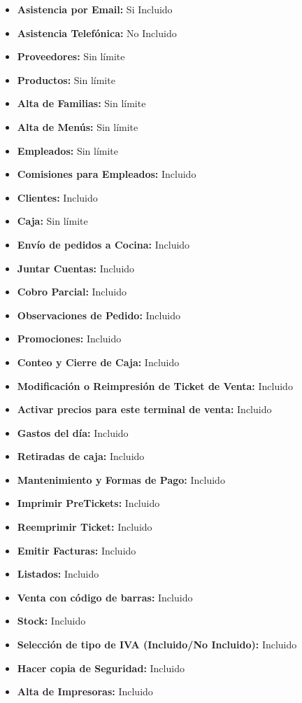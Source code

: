 \documentclass[12pt,a4paper]{article}
\begin{document}
\begin{itemize}
\item \textbf {Asistencia por Email:} Si Incluido
\item \textbf {Asistencia Telefónica:} No Incluido
\item \textbf {Proveedores:} Sin límite
\item \textbf {Productos:} Sin límite
\item \textbf {Alta de Familias:} Sin límite
\item \textbf {Alta de Menús:} Sin límite
\item \textbf {Empleados:} Sin límite
\item \textbf {Comisiones para Empleados:} Incluido
\item \textbf {Clientes:} Incluido
\item \textbf {Caja:} Sin límite
\item \textbf {Envío de pedidos a Cocina:} Incluido
\item \textbf {Juntar Cuentas:} Incluido
\item \textbf {Cobro Parcial:} Incluido
\item \textbf {Observaciones de Pedido:} Incluido
\item \textbf {Promociones:} Incluido
\item \textbf {Conteo y Cierre de Caja:} Incluido
\item \textbf {Modificación o Reimpresión de Ticket de Venta:} Incluido
\item \textbf {Activar precios para este terminal de venta:} Incluido
\item \textbf {Gastos del día:} Incluido
\item \textbf {Retiradas de caja:} Incluido
\item \textbf {Mantenimiento y Formas de Pago:} Incluido
\item \textbf {Imprimir PreTickets:} Incluido
\item \textbf {Reemprimir Ticket:} Incluido
\item \textbf {Emitir Facturas:} Incluido
\item \textbf {Listados:} Incluido
\item \textbf {Venta con código de barras:} Incluido
\item \textbf {Stock:} Incluido
\item \textbf {Selección de tipo de IVA (Incluido/No Incluido):} Incluido
\item \textbf {Hacer copia de Seguridad:} Incluido
\item \textbf {Alta de Impresoras:} Incluido

\end{itemize}
\end{document}
